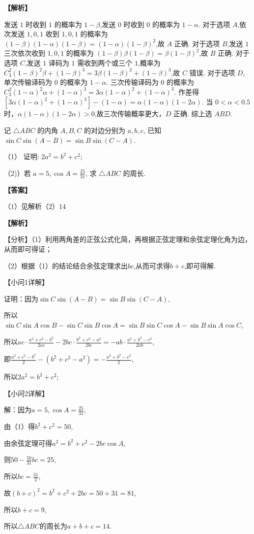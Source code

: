\documentclass{exam-zh}
\newenvironment{answer}{\par\vspace{0.5em}\noindent\textbf{【答案】}\par}{\par\vspace{1em}}
\newenvironment{solutions}{\par\vspace{0.5em}\noindent\textbf{【解析】}\par}{\par\vspace{1em}}\usepackage{lastpage}
\begin{document}
\begin{solutions}
发送 $1$ 时收到 $1$ 的概率为 $1-\beta$,发送 $0$ 时收到 $0$ 的概率为 $1-\alpha$.
对于选项 $A$,依次发送 $1,0,1$ 收到 $1,0,1$ 的概率为 $(1-\beta)(1-\alpha)(1-\beta)=(1-\alpha)(1-\beta)^{2}$,故 $A$ 正确.
对于选项 $B$,发送 $1$ 三次依次收到 $1,0,1$ 的概率为 $(1-\beta)\beta(1-\beta)=\beta(1-\beta)^{2}$,故 $B$ 正确.
对于选项 $C$,发送 $1$ 译码为 $1$ 需收到两个或三个 $1$,概率为 $C_{3}^{2}(1-\beta)^{2}\beta+(1-\beta)^{3}=3\beta(1-\beta)^{2}+(1-\beta)^{3}$,故 $C$ 错误.
对于选项 $D$,单次传输译码为 $0$ 的概率为 $1-\alpha$. 三次传输译码为 $0$ 的概率为 $C_{3}^{2}(1-\alpha)^{2}\alpha+(1-\alpha)^{3}=3\alpha(1-\alpha)^{2}+(1-\alpha)^{3}$.
作差得 $[3\alpha(1-\alpha)^{2}+(1-\alpha)^{3}]-(1-\alpha)=\alpha(1-\alpha)(1-2\alpha)$.
当 $0<\alpha<0.5$ 时，$\alpha(1-\alpha)(1-2\alpha)>0$,故三次传输概率更大，$D$ 正确.
综上选 $ABD$.
\end{solutions}


\begin{question}
记 $\triangle ABC$ 的内角 $A,B,C$ 的对边分别为 $a,b,c$, 已知 $\sin C\sin(A-B)=\sin B\sin(C-A)$.

（1） 证明: $2a^2=b^2+c^2$;

（2)）若 $a=5, \cos A=\frac{25}{31}$, 求 $\triangle ABC$ 的周长.
\end{question}

\begin{answer}
$（1）见解析
（2）14$
\end{answer}

\begin{solutions}
【分析】（1）利用两角差的正弦公式化简，再根据正弦定理和余弦定理化角为边，从而即可得证；

（2）根据（1）的结论结合余弦定理求出$bc$,从而可求得$b+c$,即可得解.

【小问1详解】

证明：因为$\sin C\sin(A-B)=\sin B\sin(C-A)$,

所以$\sin C\sin A\cos B-\sin C\sin B\cos A=\sin B\sin C\cos A-\sin B\sin A\cos C$,

所以$ac\cdot\frac{a^2+c^2-b^2}{2ac}-2bc\cdot\frac{b^2+c^2-a^2}{2bc}=-ab\cdot\frac{a^2+b^2-c^2}{2ab}$,

即$\frac{a^2+c^2-b^2}{2}-\left(b^2+c^2-a^2\right)=-\frac{a^2+b^2-c^2}{2}$,

所以$2a^2=b^2+c^2$;

【小问2详解】

解：因为$a=5,\cos A=\frac{25}{31}$,

由（1）得$b^2+c^2=50$,

由余弦定理可得$a^2=b^2+c^2-2bc\cos A$,

则$50-\frac{50}{31}bc=25$,

所以$bc=\frac{31}{2}$,

故$(b+c)^2=b^2+c^2+2bc=50+31=81$,

所以$b+c=9$,

所以$\triangle ABC$的周长为$a+b+c=14$.
\end{solutions}
\end{document}
